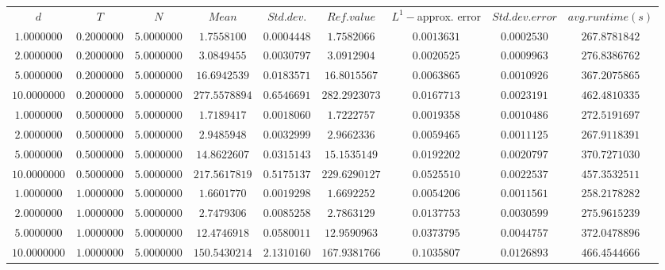 \begin{tabular}{ccccccccc}
$d$ & $T$ & $N$ & $Mean$ & $Std. dev.$ & $Ref. value$ & $L^1-$approx. error & $Std. dev. error$ & $avg. runtime (s)$\\
$1.0000000$ & $0.2000000$ & $5.0000000$ & $1.7558100$ & $0.0004448$ & $1.7582066$ & $0.0013631$ & $0.0002530$ & $267.8781842$\\
$2.0000000$ & $0.2000000$ & $5.0000000$ & $3.0849455$ & $0.0030797$ & $3.0912904$ & $0.0020525$ & $0.0009963$ & $276.8386762$\\
$5.0000000$ & $0.2000000$ & $5.0000000$ & $16.6942539$ & $0.0183571$ & $16.8015567$ & $0.0063865$ & $0.0010926$ & $367.2075865$\\
$10.0000000$ & $0.2000000$ & $5.0000000$ & $277.5578894$ & $0.6546691$ & $282.2923073$ & $0.0167713$ & $0.0023191$ & $462.4810335$\\
$1.0000000$ & $0.5000000$ & $5.0000000$ & $1.7189417$ & $0.0018060$ & $1.7222757$ & $0.0019358$ & $0.0010486$ & $272.5191697$\\
$2.0000000$ & $0.5000000$ & $5.0000000$ & $2.9485948$ & $0.0032999$ & $2.9662336$ & $0.0059465$ & $0.0011125$ & $267.9118391$\\
$5.0000000$ & $0.5000000$ & $5.0000000$ & $14.8622607$ & $0.0315143$ & $15.1535149$ & $0.0192202$ & $0.0020797$ & $370.7271030$\\
$10.0000000$ & $0.5000000$ & $5.0000000$ & $217.5617819$ & $0.5175137$ & $229.6290127$ & $0.0525510$ & $0.0022537$ & $457.3532511$\\
$1.0000000$ & $1.0000000$ & $5.0000000$ & $1.6601770$ & $0.0019298$ & $1.6692252$ & $0.0054206$ & $0.0011561$ & $258.2178282$\\
$2.0000000$ & $1.0000000$ & $5.0000000$ & $2.7479306$ & $0.0085258$ & $2.7863129$ & $0.0137753$ & $0.0030599$ & $275.9615239$\\
$5.0000000$ & $1.0000000$ & $5.0000000$ & $12.4746918$ & $0.0580011$ & $12.9590963$ & $0.0373795$ & $0.0044757$ & $372.0478896$\\
$10.0000000$ & $1.0000000$ & $5.0000000$ & $150.5430214$ & $2.1310160$ & $167.9381766$ & $0.1035807$ & $0.0126893$ & $466.4544666$\\
\end{tabular}

